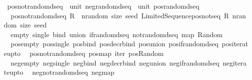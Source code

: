 \begin{isabellebody}
\ pos{\isacharunderscore}{\kern0pt}not{\isacharunderscore}{\kern0pt}random{\isacharunderscore}{\kern0pt}dseq\ {\isacharcolon}{\kern0pt}{\isacharcolon}{\kern0pt}\ {\isachardoublequoteopen}unit\ neg{\isacharunderscore}{\kern0pt}random{\isacharunderscore}{\kern0pt}dseq\ {\isacharequal}{\kern0pt}{\isachargreater}{\kern0pt}\ unit\ pos{\isacharunderscore}{\kern0pt}random{\isacharunderscore}{\kern0pt}dseq{\isachardoublequoteclose}\isanewline
{}\isanewline
\ \ {\isachardoublequoteopen}pos{\isacharunderscore}{\kern0pt}not{\isacharunderscore}{\kern0pt}random{\isacharunderscore}{\kern0pt}dseq\ R\ {\isacharequal}{\kern0pt}\ {\isacharparenleft}{\kern0pt}{\isasymlambda}nrandom\ size\ seed{\isachardot}{\kern0pt}\ Limited{\isacharunderscore}{\kern0pt}Sequence{\isachardot}{\kern0pt}pos{\isacharunderscore}{\kern0pt}not{\isacharunderscore}{\kern0pt}seq\ {\isacharparenleft}{\kern0pt}R\ nrandom\ size\ seed{\isacharparenright}{\kern0pt}{\isacharparenright}{\kern0pt}{\isachardoublequoteclose}\isanewline
\isanewline
\isanewline
{}\isamarkupfalse%
\ {\isacharparenleft}{\kern0pt}\isanewline
\ \ empty\ single\ bind\ union\ if{\isacharunderscore}{\kern0pt}random{\isacharunderscore}{\kern0pt}dseq\ not{\isacharunderscore}{\kern0pt}random{\isacharunderscore}{\kern0pt}dseq\ map\ Random\isanewline
\ \ pos{\isacharunderscore}{\kern0pt}empty\ pos{\isacharunderscore}{\kern0pt}single\ pos{\isacharunderscore}{\kern0pt}bind\ pos{\isacharunderscore}{\kern0pt}decr{\isacharunderscore}{\kern0pt}bind\ pos{\isacharunderscore}{\kern0pt}union\ pos{\isacharunderscore}{\kern0pt}if{\isacharunderscore}{\kern0pt}random{\isacharunderscore}{\kern0pt}dseq\ pos{\isacharunderscore}{\kern0pt}iterate{\isacharunderscore}{\kern0pt}upto\isanewline
\ \ pos{\isacharunderscore}{\kern0pt}not{\isacharunderscore}{\kern0pt}random{\isacharunderscore}{\kern0pt}dseq\ pos{\isacharunderscore}{\kern0pt}map\ iter\ pos{\isacharunderscore}{\kern0pt}Random\isanewline
\ \ neg{\isacharunderscore}{\kern0pt}empty\ neg{\isacharunderscore}{\kern0pt}single\ neg{\isacharunderscore}{\kern0pt}bind\ neg{\isacharunderscore}{\kern0pt}decr{\isacharunderscore}{\kern0pt}bind\ neg{\isacharunderscore}{\kern0pt}union\ neg{\isacharunderscore}{\kern0pt}if{\isacharunderscore}{\kern0pt}random{\isacharunderscore}{\kern0pt}dseq\ neg{\isacharunderscore}{\kern0pt}iterate{\isacharunderscore}{\kern0pt}upto\isanewline
\ \ neg{\isacharunderscore}{\kern0pt}not{\isacharunderscore}{\kern0pt}random{\isacharunderscore}{\kern0pt}dseq\ neg{\isacharunderscore}{\kern0pt}map\isanewline

\end{isabellebody}
